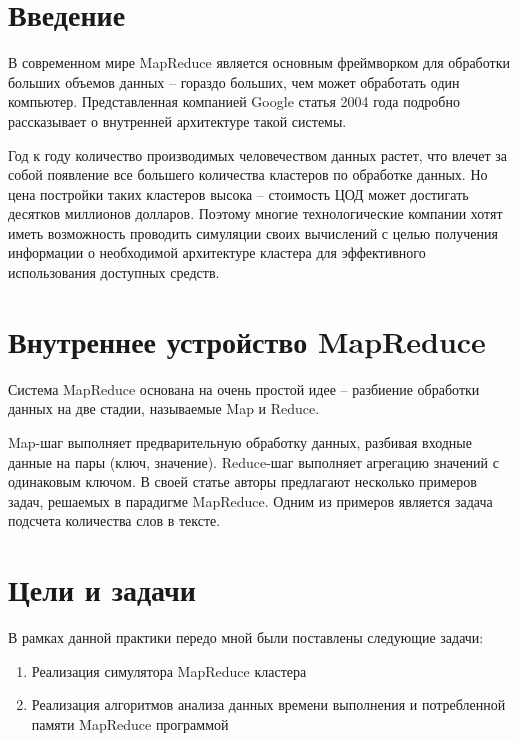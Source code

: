 \documentclass[a4paper,12pt]{article}
\begin{document}
    
    \newpage
    \tableofcontents
    \newpage
    
    \section{Введение}

    В современном мире MapReduce является основным фреймворком для обработки
    больших объемов данных -- гораздо больших, чем может обработать один
    компьютер. Представленная компанией Google статья \cite{google_mapreduce}
    2004 года подробно рассказывает о внутренней архитектуре такой системы. 

    Год к году количество производимых человечеством данных растет, что влечет
    за собой появление все большего количества кластеров по обработке данных. Но
    цена постройки таких кластеров высока -- стоимость ЦОД может достигать
    десятков миллионов долларов. Поэтому многие технологические компании хотят
    иметь возможность проводить симуляции своих вычислений с целью получения 
    информации о необходимой архитектуре кластера для эффективного использования 
    доступных средств.

    \section{Внутреннее устройство MapReduce}

    Система MapReduce основана на очень простой идее -- разбиение обработки
    данных на две стадии, называемые Map и Reduce. 

    Map-шаг выполняет предварительную обработку данных, разбивая входные данные
    на пары (ключ, значение). Reduce-шаг выполняет агрегацию значений с
    одинаковым ключом. В своей статье авторы предлагают несколько примеров
    задач, решаемых в парадигме MapReduce. Одним из примеров является задача
    подсчета количества слов в тексте.

    \section{Цели и задачи}

    В рамках данной практики передо мной были поставлены следующие задачи:

    \begin{enumerate}
        \item Реализация симулятора MapReduce кластера
        \item Реализация алгоритмов анализа данных времени выполнения и
        потребленной памяти MapReduce программой
    \end{enumerate}
\end{document}
